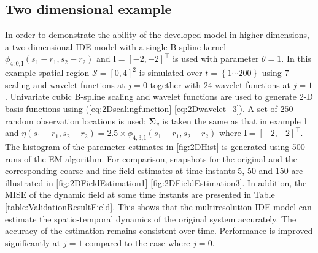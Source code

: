 \documentclass[11pt,draftcls,onecolumn,peerreview]{IEEEtran}
\begin{document}
{\subsection{Two dimensional example}
In order to demonstrate the ability of the developed model in higher dimensions, a two dimensional IDE model with a single B-spline kernel $\phi_{4;0,\mathbf{l}}\left(s_1-r_1,s_2-r_2\right) $ and $\mathbf l=[-2,-2]^ \top$ is used with parameter $\theta=1$. In this example spatial region $\mathcal{S}=[0,4]^2 $ is simulated over $t=\left\lbrace1 \cdots 200  \right\rbrace $ using $7$ scaling and wavelet functions at $j=0$ together with $24$ wavelet functions at $j=1$. Univariate cubic B-spline scaling and wavelet functions are used to generate 2-D basis functions using (\ref{eq:2Dscalingfunction}-\ref{eq:2Dwavelet_3}). A set of $250$ random  observation locations is used; $\mathbf{\Sigma}_v$ is taken the same as that in example 1 and $ \eta\left(s_1-r_1,s_2-r_2\right) =2.5\times\phi_{4,3,\mathbf{l}}\left(s_1-r_1,s_2-r_2\right)$ where $\mathbf l=[-2,-2]^ \top$. The histogram of the parameter estimates  in \figurename{\ref{fig:2DHist} is generated using 500 runs of the EM algorithm. For comparison, snapshots for the original and the corresponding coarse and fine field estimates at time instants 5, 50 and 150 are illustrated in \figurename{\ref{fig:2DFieldEstimation1}-\ref{fig:2DFieldEstimation3}}. In addition, the MISE of the dynamic field at some time instants are presented in Table \ref{table:ValidationResultField}.  This shows that the multiresolution IDE model can estimate the spatio-temporal dynamics of the original system accurately. The accuracy of the estimation remains consistent over time. Performance is improved significantly at $j=1$ compared to the case where $j=0$.
}}
\end{document}
